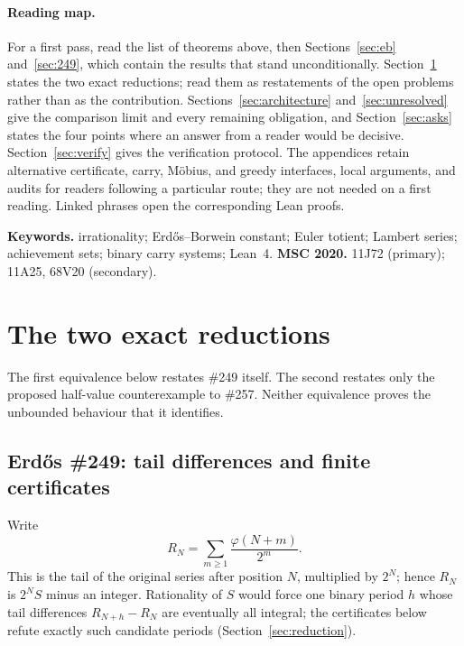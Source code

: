 \documentclass[11pt]{article}
\theoremstyle{definition}
\theoremstyle{remark}
\newcommand{\ph}{\varphi}
\begin{document}
\paragraph{Reading map.}
For a first pass, read the list of theorems above, then
Sections~\ref{sec:eb} and~\ref{sec:249}, which contain the results that stand
unconditionally.  Section~\ref{sec:spines} states the two exact reductions;
read them as restatements of the open problems rather than as the
contribution.  Sections~\ref{sec:architecture} and~\ref{sec:unresolved} give
the comparison limit and every remaining obligation, and
Section~\ref{sec:asks} states the four points where an answer from a reader
would be decisive.  Section~\ref{sec:verify} gives the verification protocol.
The appendices retain alternative certificate, carry, M\"obius, and greedy
interfaces, local arguments, and audits for readers following a particular
route; they are not needed on a first reading.  Linked phrases open the
corresponding Lean proofs.

\medskip
\noindent\textbf{Keywords.} irrationality; Erd\H{o}s--Borwein constant;
Euler totient; Lambert series; achievement sets; binary carry systems; Lean~4.
\qquad
\textbf{MSC 2020.} 11J72 (primary); 11A25, 68V20 (secondary).

\section{The two exact reductions}\label{sec:spines}

The first equivalence below restates \#249 itself.  The second restates only
the proposed half-value counterexample to \#257.  Neither equivalence proves
the unbounded behaviour that it identifies.

\subsection{Erd\H{o}s \#249: tail differences and finite certificates}
\label{res:249story}

Write
\[
 R_N=\sum_{m\geq1}\frac{\ph(N+m)}{2^m}.
\]
This is the tail of the original series after position \(N\), multiplied by
\(2^N\); hence \(R_N\) is \(2^NS\) minus an integer.  Rationality of \(S\) would
force one binary period \(h\) whose tail differences \(R_{N+h}-R_N\) are
eventually all integral; the certificates below refute exactly such
candidate periods (Section~\ref{sec:reduction}).
\end{document}
